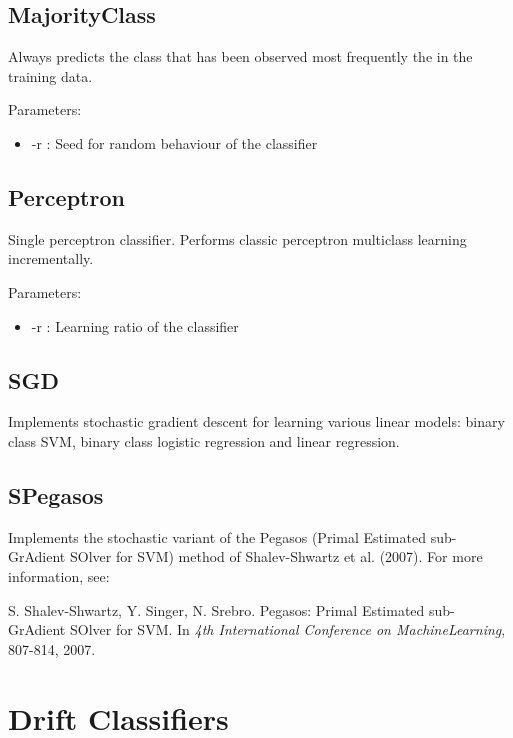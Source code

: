 \documentclass[a4paper,12pt,twoside]{book}
\begin{document}
\subsection{MajorityClass}
Always predicts the class that has been observed most frequently the in the training data.

Parameters:

\begin{itemize}
\item -r : Seed for random behaviour of the classifier
\end{itemize}


\subsection{Perceptron}
  Single perceptron classifier. Performs classic perceptron multiclass learning incrementally.
 
Parameters:
\begin{itemize}
\item -r : Learning ratio of the classifier
\end{itemize}



\subsection{SGD}
 Implements stochastic gradient descent for learning various linear models: binary class SVM, binary class logistic regression and linear regression.
 
\subsection{SPegasos}

 Implements the stochastic variant of the Pegasos (Primal Estimated sub-GrAdient SOlver for SVM) method of Shalev-Shwartz et al. (2007). For more information, see:

 \begin{itemize}
S. Shalev-Shwartz, Y. Singer, N. Srebro.
\newblock Pegasos: Primal Estimated sub-GrAdient SOlver for SVM.
\newblock In {\em 4th International Conference on MachineLearning},  807-814, 2007.
\end{itemize}

\section{Drift Classifiers}
\end{document}
